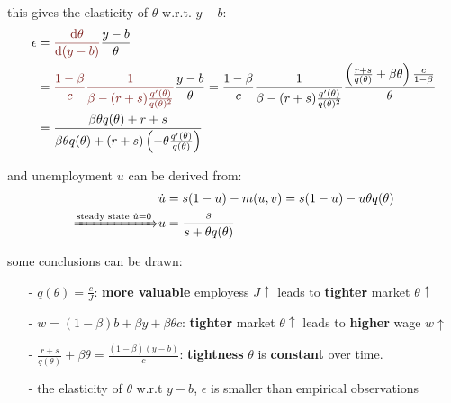 \documentclass[10pt,landscape,a4paper]{article}
\begin{document}
\begin{multicols*}{3}
this gives the elasticity of $\theta$ w.r.t. $y-b$:
\begin{align*}
    \epsilon &={\color{myred}\frac{\mathrm{d}\theta}{\mathrm{d}(y-b)}}\frac{y-b}{\theta} \\
    &= {\color{myred} \frac{1-\beta}{c}\frac{1}{\beta-(r+s)\frac{q'(\theta)}{q(\theta)^2}} }\frac{y-b}{\theta} = \frac{1-\beta}{c}\frac{1}{\beta-(r+s)\frac{q'(\theta)}{q(\theta)^2}} \frac{\left(\frac{r+s}{q(\theta)}+\beta\theta\right)\frac{c}{1-\beta}}{\theta}\\
    &= \frac{\beta\theta q(\theta)+r+s}{\beta\theta q(\theta)+(r+s)\left(-\theta \frac{q'(\theta)}{q(\theta)}\right)}
\end{align*}

and unemployment $u$ can be derived from:
\begin{align*}
    &\dot{u} = s(1-u)-m(u,v) = s(1-u) - u\theta q(\theta)\\
    \xRightarrow{\text{steady state }\dot{u}=0}& u=\frac{s}{s+\theta q(\theta)}
\end{align*}

some conclusions can be drawn:
\begin{itemize}
    \item[-] $q(\theta)=\frac{c}{J}$: \textbf{more valuable} employess $J\uparrow$ leads to \textbf{tighter} market $\theta \uparrow$ 
    \item[-] $w=(1-\beta)b+\beta y+\beta\theta c$: \textbf{tighter} market $\theta\uparrow$ leads to \textbf{higher} wage $w\uparrow$
    \item[-] $\frac{r+s}{q(\theta)}+\beta\theta = \frac{(1-\beta)(y-b)}{c}$: \textbf{tightness} $\theta$ is \textbf{constant} over time.
    \item[-] the elasticity of $\theta$ w.r.t $y-b$, $\epsilon$ is smaller than empirical observations
\end{itemize}


\end{multicols*}
\end{document}
